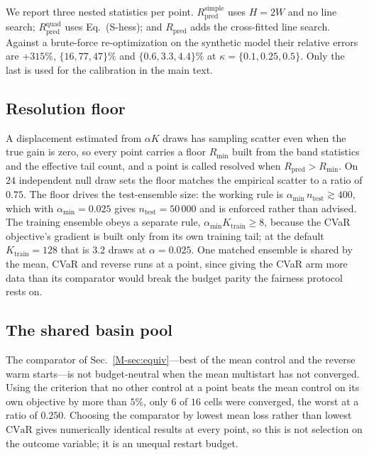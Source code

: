 \documentclass[aps,pra,onecolumn,notitlepage,superscriptaddress,nofootinbib,floatfix]{revtex4-2}
\newcommand{\cvar}{\mathrm{CVaR}}
\begin{document}
We report three nested statistics per point. $R_{\mathrm{pred}}^{\mathrm{simple}}$
uses $H=2W$ and no line search; $R_{\mathrm{pred}}^{\mathrm{quad}}$ uses
Eq.~(S-hess); and $R_{\mathrm{pred}}$ adds the cross-fitted line search.
Against a brute-force re-optimization on the synthetic model their relative
errors are $+315\%$, $\{16,77,47\}\%$ and $\{0.6,3.3,4.4\}\%$ at
$\kappa=\{0.1,0.25,0.5\}$. Only the last is used for the calibration in the
main text.

\subsection{Resolution floor}

A displacement estimated from $\alpha K$ draws has sampling scatter even when
the true gain is zero, so every point carries a floor $R_{\min}$ built from
the band statistics and the effective tail count, and a point is called
resolved when $R_{\mathrm{pred}}>R_{\min}$. On $24$ independent null draw sets
the floor matches the empirical scatter to a ratio of $0.75$. The floor
drives the test-ensemble size: the working rule is
$\alpha_{\min}\,n_{\mathrm{test}}\gtrsim400$, which with
$\alpha_{\min}=0.025$ gives $n_{\mathrm{test}}=50\,000$ and is enforced
rather than advised. The training ensemble obeys a separate rule,
$\alpha_{\min}K_{\mathrm{train}}\ge8$, because the CVaR objective's gradient
is built only from its own training tail; at the default
$K_{\mathrm{train}}=128$ that is $3.2$ draws at $\alpha=0.025$. One matched
ensemble is shared by the mean, CVaR and reverse runs at a point, since
giving the CVaR arm more data than its comparator would break the budget
parity the fairness protocol rests on.

\subsection{The shared basin pool}

The comparator of Sec.~\ref{M-sec:equiv}---best of the mean control and the
reverse warm starts---is not budget-neutral when the mean multistart has not
converged. Using the criterion that no other control at a point beats the
mean control on its own objective by more than $5\%$, only $6$ of $16$ cells
were converged, the worst at a ratio of $0.250$. Choosing the comparator by
lowest mean loss rather than lowest $\cvar$ gives numerically identical
results at every point, so this is not selection on the outcome variable; it
is an unequal restart budget.
\end{document}
